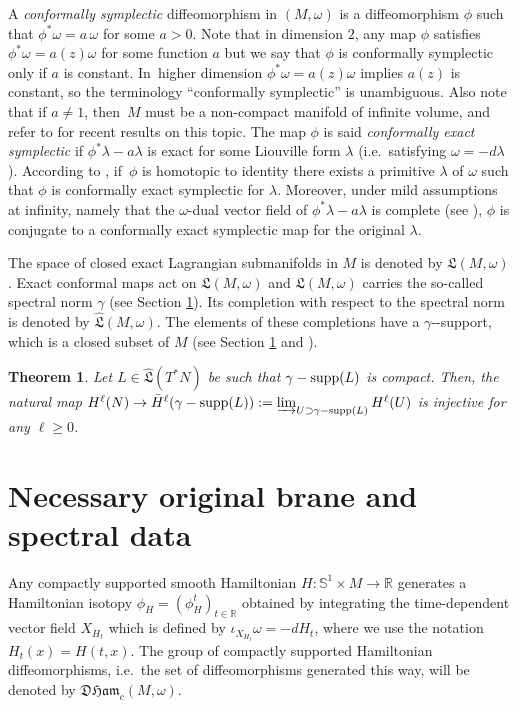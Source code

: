 \documentclass[10pt,a4paper]{amsart}
\newcommand{\ie}{i.e.\ }
\providecommand{\nobreakdash}{\nobreak\hbox{-}}
\newtheorem{thm}{Theorem}[section]
\theoremstyle{definition}
\newcommand{\R}{\mathbb{R}}
\DeclareMathOperator{\gammasupp}{\gamma\textup{-supp}}
\newcommand{\DHam}{\mathfrak{DHam}}
\newcommand{\fL}{\mathfrak {L}}
\newcommand{\hatL}{\widehat{\fL}}
\begin{document}
A \emph{conformally symplectic} diffeomorphism in $(M,\omega)$ is a diffeomorphism $\phi$ such that $\phi^*\omega=a\, \omega$ for some $a>0$. Note that in dimension $2$, any map $\phi$ satisfies $\phi^*\omega=a(z)\omega$ for some function $a$ but we say that $\phi$ is conformally symplectic only if $a$ is constant. In~higher dimension $\phi^*\omega=a(z)\omega$ implies $a(z)$ is constant, so the terminology ``conformally symplectic'' is unambiguous. Also note that if $a\neq 1$, then~$M$ must be a non-compact manifold of infinite volume, and refer to
\cite{Arnaud-Fejoz} for recent results on this topic. The map $\phi$ is said \emph{conformally exact symplectic} if $\phi^*{\lambda}-a \lambda$ is exact
for some Liouville form $\lambda$ (\ie satisfying $\omega=-d\lambda$).
According to \cite[App.\,B]{Arnaud-Fejoz}, if~$\phi$ is homotopic to identity there exists a primitive $\lambda$ of $\omega$ such that $\phi$ is conformally exact symplectic for $\lambda$. Moreover, under mild assumptions at infinity, namely that the $\omega$-dual vector field of $\phi^* \lambda-a \lambda$ is complete (see \cite[App.\,B, Prop.\,10]{Arnaud-Fejoz}), $\phi$ is conjugate to a conformally exact symplectic map for the original $\lambda$.

The space of closed exact Lagrangian submanifolds in $M$ is denoted by $\fL(M,\omega)$.
Exact conformal maps act on $\fL(M,\omega)$ and $\fL(M,\omega)$ carries the so-called spectral norm $\gamma$ (see Section \ref{sec:preliminaries}). Its completion with respect to the spectral norm is denoted by $\hatL(M,\omega)$. The elements of these completions have a $\gamma$\nobreakdash-support, which is a closed subset of $M$ (see Section \ref{sec:preliminaries} and \cite{Viterbo-gammas}).

\setcounter{thm}{3}
\begin{thm}\label{th:cohomology}
Let $L \in \hatL(T^*N)$ be such that $\gammasupp(L)$ is compact.
Then, the natural map $H^\ell(N)\to \bar H^\ell(\gammasupp(L)):=\varinjlim_{U\supset \gammasupp(L)} H^\ell(U)$ is injective for any $\ell \geq 0$.
\end{thm}

\section{Necessary original brane and spectral data}\label{sec:preliminaries}
Any compactly supported smooth Hamiltonian $H:\mathbb{S}^1\times M\to \R$ generates a Hamiltonian isotopy $\phi_H=(\phi_H^t)_{t\in\R}$ obtained by integrating the time-dependent vector field $X_{H_t}$ which is defined by $\iota_{X_{H_t}}\omega=-dH_t$, where we use the notation $H_t(x)=H(t,x)$. The group of compactly supported Hamiltonian diffeomorphisms, \ie the set of diffeomorphisms generated this way, will be denoted by $\DHam_c(M,\omega)$.
\end{document}
